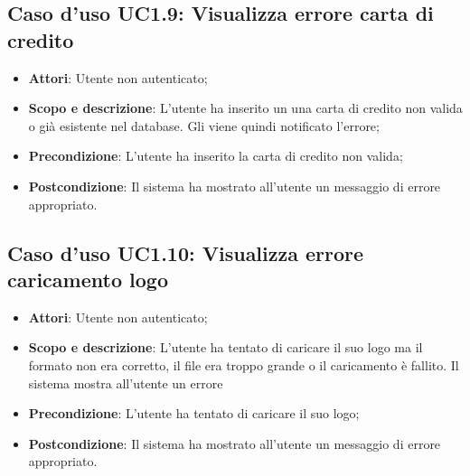 \documentclass[12pt,a4paper,titlepage]{article}
\begin{document}
	\subsection{Caso d'uso UC1.9: Visualizza errore carta di credito}
	\label{UC1.9}
	\begin{itemize}
		\item \textbf{Attori}: Utente non autenticato;
		\item \textbf{Scopo e descrizione}: L'utente ha inserito un una carta di credito non valida o già esistente nel database. Gli viene quindi notificato l'errore;
		\item \textbf{Precondizione}: L'utente ha inserito la carta di credito non valida;
		\item \textbf{Postcondizione}: Il sistema ha mostrato all'utente un messaggio di errore appropriato.
	\end{itemize}
	\subsection{Caso d'uso UC1.10: Visualizza errore caricamento logo}
	\label{UC1.10}
	\begin{itemize}
		\item \textbf{Attori}: Utente non autenticato;
		\item \textbf{Scopo e descrizione}: L'utente ha tentato di caricare il suo logo ma il formato non era corretto, il file era troppo grande o il caricamento è fallito. Il sistema mostra all'utente un errore
		\item \textbf{Precondizione}: L'utente ha tentato di caricare il suo logo;
		\item \textbf{Postcondizione}: Il sistema ha mostrato all'utente un messaggio di errore appropriato.
	\end{itemize}
\end{document}
